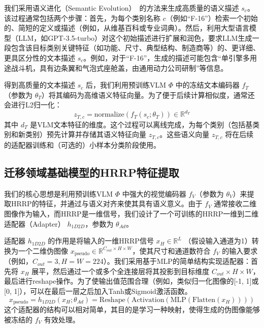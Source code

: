我们采用语义进化（Semantic Evolution）~\cite{SemFew}的方法来生成高质量的语义描述 $s_c$。该过程通常包括两个步骤：首先，为每个类别名称 $c$（例如“F-16”）检索一个初始的、简短的定义或描述（例如，从维基百科或专业词典）。然后，利用大型语言模型（LLM，如GPT-3.5-turbo）对这个初始描述进行扩展和润色，要求LLM生成一段包含该目标类别关键特征（如功能、尺寸、典型结构、制造商等）的、更详细、更具区分性的文本描述 $s_c$。例如，对于“F-16”，生成的描述可能包含“单引擎多用途战斗机，具有边条翼和气泡式座舱盖，由通用动力公司研制”等信息。

得到高质量的文本描述 $s_c$ 后，我们利用预训练VLM $\Phi$ 中的冻结文本编码器 $f_T$（参数为 $\theta_T$）将其编码为高维语义特征向量。为了便于后续计算相似度，通常还会进行L2归一化：
\begin{equation}
    z_{T,c} = \text{normalize}(f_T(s_c; \theta_T)) \in \mathbb{R}^{d_T}
    \label{eq:semantic_encoding}
\end{equation}
其中 $d_T$ 是VLM文本特征的维度。这个过程可以离线完成，为每个类别（包括基类别和新类别）预先计算并存储其语义特征向量 $z_{T,c}$。这些语义向量 $z_{T,c}$ 将在后续的适配器训练和（可选的）小样本分类阶段使用。

\subsection{迁移领域基础模型的HRRP特征提取}
\label{subsec:hrrp_feature_vlm}

我们的核心思想是利用预训练VLM $\Phi$ 中强大的视觉编码器 $f_V$（参数为 $\theta_V$）来提取HRRP的特征，并通过与语义对齐来使其具有语义意义。由于 $f_V$ 通常接收二维图像作为输入，而HRRP是一维信号，我们设计了一个可训练的HRRP一维到二维适配器（Adapter） $h_{1D2D}$，参数为 $\theta_{Ad}$。

适配器 $h_{1D2D}$ 的作用是将输入的一维HRRP信号 $x_H \in \mathbb{R}^{L}$ （假设输入通道为1）转换为一个二维伪图像 $x_{\text{pseudo}} \in \mathbb{R}^{C_{out} \times H \times W}$，使其尺寸和通道数符合 $f_V$ 的输入要求（例如，$C_{out}=3, H=W=224$）。我们采用基于MLP的简单结构实现适配器：首先将 $x_H$ 展平，然后通过一个或多个全连接层将其投影到目标维度 $C_{out} \times H \times W$，最后进行reshape操作。为了使输出值范围合理（例如，类似归一化图像的[-1, 1]或[0, 1]），可以在最后一层之后加入Tanh或Sigmoid激活函数。
\begin{equation}
    x_{\text{pseudo}} = h_{1D2D}(x_H; \theta_{Ad}) = \text{Reshape}(\text{Activation}(\text{MLP}(\text{Flatten}(x_H))))
    \label{eq:adapter_1d2d}
\end{equation}
这个适配器的结构可以相对简单，其目的是学习一种映射，使得生成的伪图像能够被冻结的 $f_V$ 有效处理。

